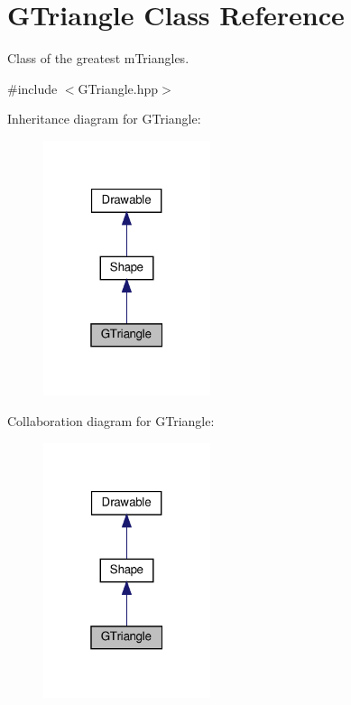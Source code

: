 \hypertarget{classGTriangle}{}\section{G\+Triangle Class Reference}
\label{classGTriangle}


Class of the greatest mTriangles.




{\ttfamily \#include $<$G\+Triangle.\+hpp$>$}



Inheritance diagram for G\+Triangle\+:\nopagebreak
\begin{figure}[H]
\begin{center}
\leavevmode
\includegraphics[width=139pt]{classGTriangle__inherit__graph}
\end{center}
\end{figure}


Collaboration diagram for G\+Triangle\+:\nopagebreak
\begin{figure}[H]
\begin{center}
\leavevmode
\includegraphics[width=139pt]{classGTriangle__coll__graph}
\end{center}
\end{figure}
